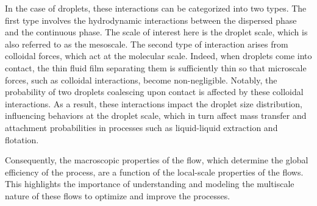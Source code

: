 In the case of droplets, these interactions can be categorized into two types. The first type involves the hydrodynamic interactions between the dispersed phase and the continuous phase. 
The scale of interest here is the droplet scale, which is also referred to as the mesoscale. 
The second type of interaction arises from colloidal forces, which act at the molecular scale.
Indeed, when droplets come into contact, the thin fluid film separating them is sufficiently thin so that microscale forces, such as colloidal interactions, become non-negligible. 
Notably, the probability of two droplets coalescing upon contact is affected by these colloidal interactions. 
As a result, these interactions impact the droplet size distribution, influencing behaviors at the droplet scale, which in turn affect mass transfer and attachment probabilities in processes such as liquid-liquid extraction and flotation.

Consequently, the macroscopic properties of the flow, which determine the global efficiency of the process, are a function of the local-scale properties of the flows.
This highlights the importance of understanding and modeling the multiscale nature of these flows to optimize and improve the processes.

